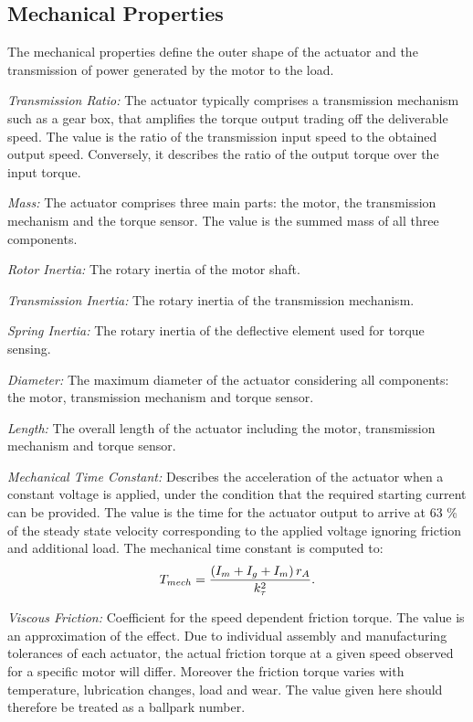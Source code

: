 \documentclass[a4paper,10pt]{cjtdsheet}      %
\begin{document}
\begin{multicols}{2}

%
%
\subsection*{Mechanical Properties}
The mechanical properties define the outer shape of the actuator and the transmission of power generated by the motor to the load.

\emph{Transmission Ratio:} The actuator typically comprises a transmission mechanism such as a gear box, that amplifies the torque output trading off the deliverable speed. The value is the ratio of the transmission input speed to the obtained output speed. Conversely, it describes the ratio of the output torque over the input torque.

\emph{Mass:} The actuator comprises three main parts: the motor, the transmission mechanism and the torque sensor. The value is the summed mass of all three components.

\emph{Rotor Inertia:} The rotary inertia of the motor shaft.

\emph{Transmission Inertia:} The rotary inertia of the transmission mechanism.

\emph{Spring Inertia:} The rotary inertia of the deflective element used for torque sensing.

\emph{Diameter:} The maximum diameter of the actuator considering all components: the motor, transmission mechanism and torque sensor.

\emph{Length:} The overall length of the actuator including the motor, transmission mechanism and torque sensor.

\emph{Mechanical Time Constant:} Describes the acceleration of the actuator when a constant voltage is applied, under the condition that the required starting current can be provided. The value is the time for the actuator output to arrive at 63 \% of the steady state velocity corresponding to the applied voltage ignoring friction and additional load. The mechanical time constant is computed to:
\begin{equation}
T_{mech} = \frac{
	\left(
		  I_m 
		+ I_g 
		+ I_m
	\right)
	r_A
	}
	{
	 k_\tau^2
	}.
\end{equation}

\emph{Viscous Friction:} Coefficient for the speed dependent friction torque. The value is an approximation of the effect. Due to individual assembly and manufacturing tolerances of each actuator, the actual friction torque at a given speed observed for a specific motor will differ. Moreover the friction torque varies with temperature, lubrication changes, load and wear. The value given here should therefore be treated as a ballpark number.


\end{multicols}
\end{document}
